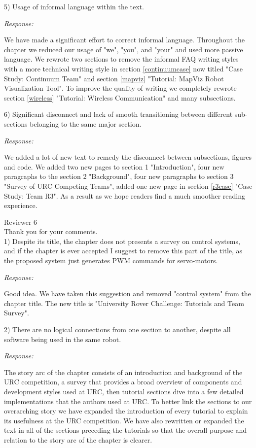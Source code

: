 \documentclass[runningheads,a4paper]{llncs}
\newcommand{\rsp}{\noindent \textit{Response:}}
\newcommand{\rev}[1]{
\newpage
\noindent Reviewer {#1}\\

\noindent Thank you for your comments.\\
}
\begin{document}
5)  Usage of informal language within the text. 

\rsp

We have made a significant effort to correct informal language. Throughout the chapter we reduced our usage of "we", "you", and "your" and used more passive language. We rewrote two sections to remove the informal FAQ writing styles with a more technical writing style in section \ref{continuumcase} now titled "Case Study: Continuum Team" and section \ref{mapviz} "Tutorial: MapViz Robot Visualization Tool". To improve the quality of writing we completely rewrote section \ref{wireless} "Tutorial: Wireless Communication" and many subsections.

6)  Significant disconnect and lack of smooth transitioning between different sub-sections belonging to the same major section.

\rsp

We added a lot of new text to remedy the disconnect between subsections, figures and code. We added two new pages to section 1 "Introduction", four new paragraphs to the section 2 "Background", four new paragraphs to section 3 "Survey of URC Competing Teams", added one new page in section \ref{r3case} "Case Study: Team R3". As a result as we hope readers find a much smoother reading experience. 

\rev{6}

1)  Despite its title, the chapter does not presents a survey on control systems, and if the chapter is ever accepted I suggest to remove this part of the title, as the proposed system just generates PWM commands for servo-motors.

\rsp

Good idea. We have taken this suggestion and removed "control system" from the chapter title. The new title is "University Rover Challenge: Tutorials and Team Survey".

2)  There are no logical connections from one section to another, despite all software being used in the same robot.

\rsp

The story arc of the chapter consists of an introduction and background of the URC competition, a survey that provides a broad overview of components and development styles used at URC, then tutorial sections dive into a few detailed implementations that the authors used at URC. To better link the sections to our overarching story we have expanded the introduction of every tutorial to explain its usefulness at the URC competition. We have also rewritten or expanded the text in all of the sections preceding the tutorials so that the overall purpose and relation to the story arc of the chapter is clearer.
\end{document}
